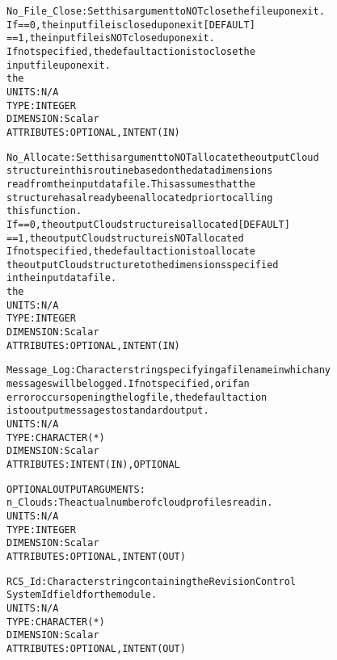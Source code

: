 \begin{alltt}
        No_File_Close:  Set this argument to NOT close the file upon exit.
                        If == 0, the input file is closed upon exit [DEFAULT]
                           == 1, the input file is NOT closed upon exit. 
                        If not specified, the default action is to close the
                        input file upon exit.
                        the 
                        UNITS:      N/A
                        TYPE:       INTEGER
                        DIMENSION:  Scalar
                        ATTRIBUTES: OPTIONAL, INTENT(IN)
 
        No_Allocate:    Set this argument to NOT allocate the output Cloud
                        structure in this routine based on the data dimensions
                        read from the input data file. This assumes that the
                        structure has already been allocated prior to calling 
                        this function.
                        If == 0, the output Cloud structure is allocated [DEFAULT]
                           == 1, the output Cloud structure is NOT allocated
                        If not specified, the default action is to allocate 
                        the output Cloud structure to the dimensions specified
                        in the input data file.
                        the 
                        UNITS:      N/A
                        TYPE:       INTEGER
                        DIMENSION:  Scalar
                        ATTRIBUTES: OPTIONAL, INTENT(IN)
 
        Message_Log:    Character string specifying a filename in which any
                        messages will be logged. If not specified, or if an
                        error occurs opening the log file, the default action
                        is to output messages to standard output.
                        UNITS:      N/A
                        TYPE:       CHARACTER(*)
                        DIMENSION:  Scalar
                        ATTRIBUTES: INTENT(IN), OPTIONAL
 
 
  OPTIONAL OUTPUT ARGUMENTS:
        n_Clouds:       The actual number of cloud profiles read in.
                        UNITS:      N/A
                        TYPE:       INTEGER
                        DIMENSION:  Scalar
                        ATTRIBUTES: OPTIONAL, INTENT(OUT)
 
        RCS_Id:         Character string containing the Revision Control
                        System Id field for the module.
                        UNITS:      N/A
                        TYPE:       CHARACTER(*)
                        DIMENSION:  Scalar
                        ATTRIBUTES: OPTIONAL, INTENT(OUT)
 

\end{alltt}
